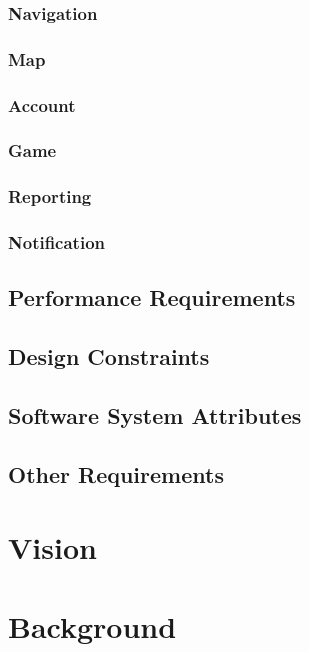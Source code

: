 \documentclass{article}
\begin{document}
    	\subsubsection{Navigation}
    	
    	\subsubsection{Map}
    	
    	\subsubsection{Account}
    	
    	\subsubsection{Game}
    	
    	\subsubsection{Reporting}
    	
    	\subsubsection{Notification}
    	
        	
        \subsection{Performance Requirements}
        \subsection{Design Constraints}
        \subsection{Software System Attributes}
        \subsection{Other Requirements}
	
	\section{Vision}


	\section{Background}
	
\end{document}
